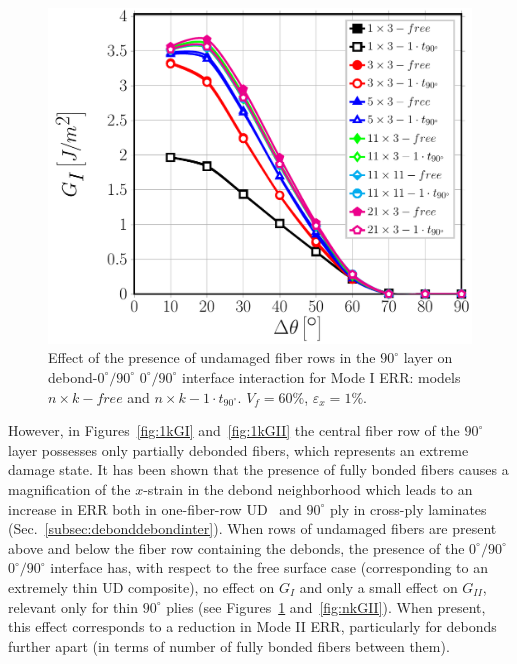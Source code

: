 \documentclass[review]{elsarticle}
\begin{document}
\begin{figure}[!h]
\centering
\includegraphics[width=\textwidth]{nxk-1-vf60-GI.pdf}
\caption{Effect of the presence of undamaged fiber rows in the $90^{\circ}$ layer on debond-$0^{\circ}/90^{\circ}$ $0^{\circ}/90^{\circ}$ interface interaction for Mode I ERR: models $n\times k-free$ and $n\times k-1\cdot t_{90^{\circ}}$. $V_{f}=60\%$, $\varepsilon_{x}=1\%$.}\label{fig:nkGI}
\end{figure}

However, in Figures~\ref{fig:1kGI} and~\ref{fig:1kGII} the central fiber row of the $90^{\circ}$ layer possesses only partially debonded fibers, which represents an extreme damage state. It has been shown that the presence of fully bonded fibers causes a magnification of the $x$-strain in the debond neighborhood which leads to an increase in ERR both in one-fiber-row UD~\cite{DiStasio2019} and $90^{\circ}$ ply in cross-ply laminates (Sec.~\ref{subsec:debonddebondinter}). When rows of undamaged fibers are present above and below the fiber row containing the debonds, the presence of the $0^{\circ}/90^{\circ}$ $0^{\circ}/90^{\circ}$ interface has, with respect to the free surface case (corresponding to an extremely thin UD composite), no effect on $G_{I}$ and only a small effect on $G_{II}$, relevant only for thin $90^{\circ}$ plies (see Figures~\ref{fig:nkGI} and~\ref{fig:nkGII}). When present, this effect corresponds to a reduction in Mode II ERR, particularly for debonds further apart (in terms of number of fully bonded fibers between them).
\end{document}
